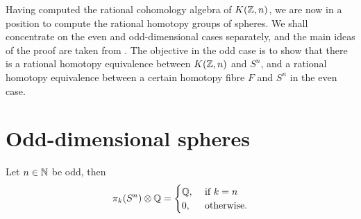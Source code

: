 \documentclass[../main.tex]{subfiles}
\begin{document}
Having computed the rational cohomology algebra of \( K(\mathbb{Z}, n) \), we are
now in a position to compute the rational homotopy groups of spheres.
We shall concentrate on the even and odd-dimensional cases separately,
and the main ideas of the proof are taken from \cite[]{Ber12}. The
objective in the odd case is to show that there is a rational homotopy
equivalence between \( K(\mathbb{Z}, n) \) and \( S^n \), and
a rational homotopy equivalence between a certain homotopy fibre
\( F \) and \( S^n \) in the even case.

\section{Odd-dimensional spheres}
\begin{theorem}
    Let \( n\in \mathbb{N} \) be odd, then
    \begin{equation}
        \label{eq:odd}
        \pi_k(S^n)\otimes \mathbb{Q} =
        \begin{cases}
            \mathbb{Q}, &\text{ if } k = n\\
            0, &\text{ otherwise.}
        \end{cases}
    \end{equation}
\end{theorem}
\end{document}
